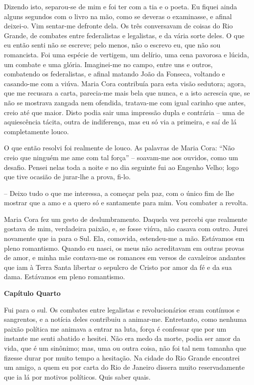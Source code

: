 Dizendo isto, separou-se de mim e foi ter com a tia e o poeta. Eu fiquei
ainda alguns segundos com o livro na mão, como se deveras o examinasse,
e afinal deixei-o. Vim sentar-me defronte dela. Os três conversavam de
coisas do Rio Grande, de combates entre federalistas e legalistas, e da
vária sorte deles. O que eu então senti não se escreve; pelo menos, não
o escrevo eu, que não sou romancista. Foi uma espécie de vertigem, um
delírio, uma cena pavorosa e lúcida, um combate e uma glória.
Imaginei-me no campo, entre uns e outros, combatendo os federalistas, e
afinal matando João da Fonseca, voltando e casando-me com a viúva. Maria
Cora contribuía para esta visão sedutora; agora, que me recusara a
carta, parecia-me mais bela que nunca, e a isto acrescia que, se não se
mostrava zangada nem ofendida, tratava-me com igual carinho que antes,
creio até que maior. Disto podia sair uma impressão dupla e contrária --
uma de aquiescência tácita, outra de indiferença, mas eu só via a
primeira, e saí de lá completamente louco.

O que então resolvi foi realmente de louco. As palavras de Maria Cora:
``Não creio que ninguém me ame com tal força'' -- soavam-me aos ouvidos,
como um desafio. Pensei nelas toda a noite e no dia seguinte fui ao
Engenho Velho; logo que tive ocasião de jurar-lhe a prova, fi-lo.

-- Deixo tudo o que me interessa, a começar pela paz, com o único fim de
lhe mostrar que a amo e a quero só e santamente para mim. Vou combater a
revolta.

Maria Cora fez um gesto de deslumbramento. Daquela vez percebi que
realmente gostava de mim, verdadeira paixão, e, se fosse viúva, não
casava com outro. Jurei novamente que ia para o Sul. Ela, comovida,
estendeu-me a mão. Estávamos em pleno romantismo. Quando eu nasci, os
meus não acreditavam em outras provas de amor, e minha mãe contava-me os
romances em versos de cavaleiros andantes que iam à Terra Santa libertar
o sepulcro de Cristo por amor da fé e da sua dama. Estávamos em pleno
romantismo.

\textbf{Capítulo Quarto}

Fui para o sul. Os combates entre legalistas e revolucionários eram
contínuos e sangrentos, e a notícia deles contribuiu a animar-me.
Entretanto, como nenhuma paixão política me animava a entrar na luta,
força é confessar que por um instante me senti abatido e hesitei. Não
era medo da morte, podia ser amor da vida, que é um sinônimo; mas, uma
ou outra coisa, não foi tal nem tamanha que fizesse durar por muito
tempo a hesitação. Na cidade do Rio Grande encontrei um amigo, a quem eu
por carta do Rio de Janeiro dissera muito reservadamente que ia lá por
motivos políticos. Quis saber quais.


